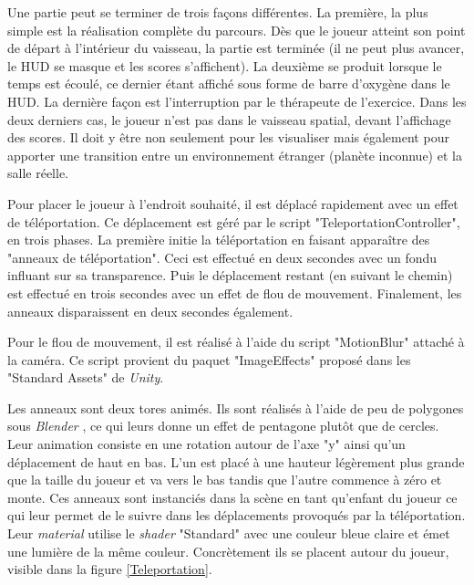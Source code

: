 		Une partie peut se terminer de trois façons différentes. La première, la plus simple est la réalisation complète du parcours. Dès que le joueur atteint son point de départ à l'intérieur du vaisseau, la partie est terminée (il ne peut plus avancer, le HUD se masque et les scores s'affichent). La deuxième se produit lorsque le temps est écoulé, ce dernier étant affiché sous forme de barre d'oxygène dans le HUD. La dernière façon est l'interruption par le thérapeute de l'exercice. Dans les deux derniers cas, le joueur n'est pas dans le vaisseau spatial, devant l'affichage des scores. Il doit y être non seulement pour les visualiser mais également pour apporter une transition entre un environnement étranger (planète inconnue) et la salle réelle.
	
		Pour placer le joueur à l'endroit souhaité, il est déplacé rapidement avec un effet de téléportation. Ce déplacement est géré par le script "TeleportationController", en trois phases. La première initie la téléportation en faisant apparaître des "anneaux de téléportation". Ceci est effectué en deux secondes avec un fondu influant sur sa transparence. Puis le déplacement restant (en suivant le chemin) est effectué en trois secondes avec un effet de flou de mouvement. Finalement, les anneaux disparaissent en deux secondes également.
		
		Pour le flou de mouvement, il est réalisé à l'aide du script "MotionBlur" attaché à la caméra. Ce script provient du paquet "ImageEffects" proposé dans les "Standard Assets" de \textit{Unity}.
		
		Les anneaux sont deux tores animés. Ils sont réalisés à l'aide de peu de polygones sous \textit{Blender} \cite{Blender_website}, ce qui leurs donne un effet de pentagone plutôt que de cercles. Leur animation consiste en une rotation autour de l'axe "y" ainsi qu'un déplacement de haut en bas. L'un est placé à une hauteur légèrement plus grande que la taille du joueur et va vers le bas tandis que l'autre commence à zéro et monte. Ces anneaux sont instanciés dans la scène en tant qu'enfant du joueur ce qui leur permet de le suivre dans les déplacements provoqués par la téléportation. Leur \textit{material} utilise le \textit{shader} "Standard" avec une couleur bleue claire et émet une lumière de la même couleur. Concrètement ils se placent autour du joueur, visible dans la figure \ref{Teleportation}.\medskip
	
